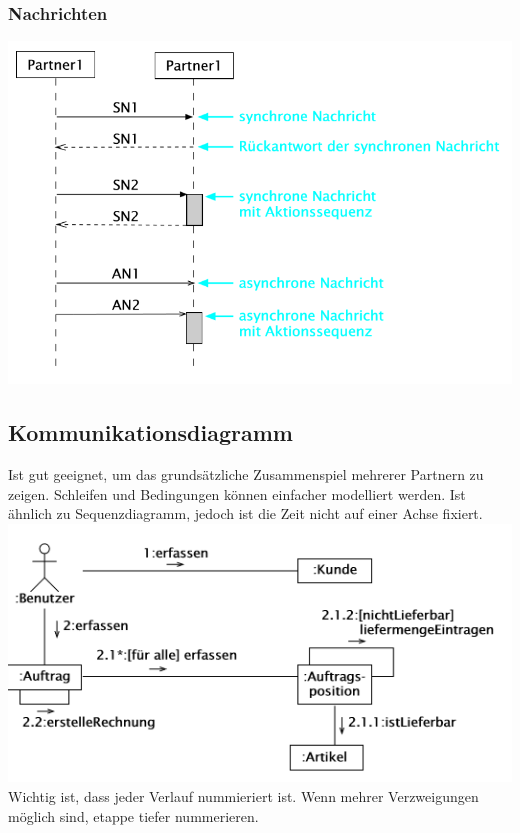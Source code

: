\subsubsection{Nachrichten}
\includegraphics[width=\columnwidth]{Images/nachrichten}

\subsection{Kommunikationsdiagramm}
Ist gut geeignet, um das grundsätzliche Zusammenspiel mehrerer Partnern zu zeigen. Schleifen und Bedingungen können einfacher modelliert werden. Ist ähnlich zu Sequenzdiagramm, jedoch ist die Zeit nicht auf einer Achse fixiert.\\

\includegraphics[width=\columnwidth]{Images/kommunikationsdiagramm}
Wichtig ist, dass jeder Verlauf nummieriert ist. Wenn mehrer Verzweigungen möglich sind, etappe tiefer nummerieren.

